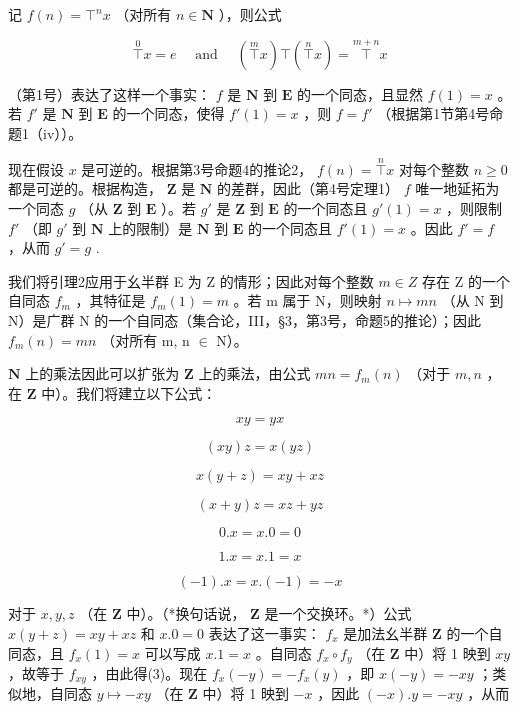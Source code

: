 记 \(f(n) = \top^n x\) （对所有 \(n \in \mathbf{N}\) ），则公式

\[
\overset {0} {\top} x = e \quad \text { and } \quad \left(\overset {m} {\top} x\right) \top \left(\overset {n} {\top} x\right) = \overset {m + n} {\top} x
\]

（第1号）表达了这样一个事实： \(f\) 是 \(\mathbf{N}\) 到 \(\mathbf{E}\) 的一个同态，且显然 \(f(1) = x\) 。若 \(f'\) 是 \(\mathbf{N}\) 到 \(\mathbf{E}\) 的一个同态，使得 \(f'(1) = x\) ，则 \(f = f'\) （根据第1节第4号命题1（iv））。

现在假设 \(x\) 是可逆的。根据第3号命题4的推论2， \(f(n) = \overset{n}{\top} x\) 对每个整数 \(n \geqslant 0\) 都是可逆的。根据构造， \(\mathbf{Z}\) 是 \(\mathbf{N}\) 的差群，因此（第4号定理1） \(f\) 唯一地延拓为一个同态 \(g\) （从 \(\mathbf{Z}\) 到 \(\mathbf{E}\) ）。若 \(g'\) 是 \(\mathbf{Z}\) 到 \(\mathbf{E}\) 的一个同态且 \(g'(1) = x\) ，则限制 \(f'\) （即 \(g'\) 到 \(\mathbf{N}\) 上的限制）是 \(\mathbf{N}\) 到 \(\mathbf{E}\) 的一个同态且 \(f'(1) = x\) 。因此 \(f' = f\) ，从而 \(g' = g\) .

我们将引理2应用于幺半群 E 为 Z 的情形；因此对每个整数 \(m \in Z\) 存在 Z 的一个自同态 \(f_{m}\) ，其特征是 \(f_{m}(1) = m\) 。若 m 属于 N，则映射 \(n \mapsto mn\) （从 N 到 N）是广群 N 的一个自同态（集合论，III，§3，第3号，命题5的推论）；因此 \(f_{m}(n) = mn\) （对所有 m, n \ensuremath{\in} N）。

\(\mathbf{N}\) 上的乘法因此可以扩张为 \(\mathbf{Z}\) 上的乘法，由公式 \(mn = f_m(n)\) （对于 \(m, n\) ，在 \(\mathbf{Z}\) 中）。我们将建立以下公式：

\[
x y = y x\tag{2}
\]

\[
(x y) z = x (y z)\tag{3}
\]

\[
x (y + z) = x y + x z\tag{4}
\]

\[
(x + y) z = x z + y z\tag{5}
\]

\[
0. x = x. 0 = 0\tag{6}
\]

\[
1. x = x. 1 = x\tag{7}
\]

\[
(- 1). x = x. (- 1) = - x\tag{8}
\]

对于 \(x, y, z\) （在 \(\mathbf{Z}\) 中）。（*换句话说， \(\mathbf{Z}\) 是一个交换环。*）公式 \(x(y + z) = xy + xz\) 和 \(x.0 = 0\) 表达了这一事实： \(f_x\) 是加法幺半群 \(\mathbf{Z}\) 的一个自同态，且 \(f_{x}(1) = x\) 可以写成 \(x.1 = x\) 。自同态 \(f_{x} \circ f_{y}\) （在 \(\mathbf{Z}\) 中）将 1 映到 \(xy\) ，故等于 \(f_{xy}\) ，由此得(3)。现在 \(f_{x}(-y) = -f_{x}(y)\) ，即 \(x(-y) = -xy\) ；类似地，自同态 \(y \mapsto -xy\) （在 \(\mathbf{Z}\) 中）将 1 映到 \(-x\) ，因此 \((-x).y = -xy\) ，从而

